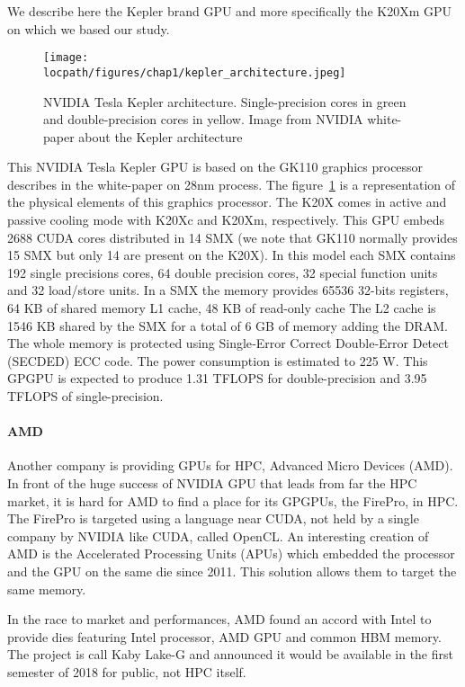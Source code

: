 We describe here the Kepler brand GPU and more specifically the K20Xm GPU on which we based our study. 
\begin{figure}
\centering
\texttt{[image: \\locpath/figures/chap1/kepler\_architecture.jpeg]}
\caption[NVIDIA Tesla Kepler architecture]{NVIDIA Tesla Kepler architecture. Single-precision cores in green and double-precision cores in yellow. Image from NVIDIA white-paper about the Kepler architecture\cite{nvidia2012nvidias}}
\label{fig:2_HARD:kepler_arch}
\end{figure}
This NVIDIA Tesla Kepler GPU is based on the GK110 graphics processor describes in the white-paper\cite{nvidia2012nvidias} on 28nm process.
The figure~\ref{fig:2_HARD:kepler_arch} is a representation of the physical elements of this graphics processor. 
The K20X comes in active and passive cooling mode with K20Xc and K20Xm, respectively.
This GPU embeds 2688 CUDA cores distributed in 14 SMX (we note that GK110 normally provides 15 SMX but only 14 are present on the K20X).
In this model each SMX contains 192 single precisions cores, 64 double precision cores, 32 special function units and 32 load/store units.
In a SMX the memory provides 65536 32-bits registers, 64 KB of shared memory L1 cache, 48 KB of read-only cache
The L2 cache is 1546 KB shared by the SMX for a total of 6 GB of memory adding the DRAM.
The whole memory is protected using Single‐Error Correct Double‐Error Detect (SECDED) ECC code.
The power consumption is estimated to 225 W.
This GPGPU is expected to produce 1.31 TFLOPS for double-precision and 3.95 TFLOPS of single-precision.

\paragraph{AMD}
Another company is providing GPUs for HPC, Advanced Micro Devices (AMD). 
In front of the huge success of NVIDIA GPU that leads from far the HPC market, it is hard for AMD to find a place for its GPGPUs, the FirePro, in HPC. 
The FirePro is targeted using a language near CUDA, not held by a single company by NVIDIA like CUDA, called OpenCL. 
An interesting creation of AMD is the Accelerated Processing Units (APUs) which embedded the processor and the GPU on the same die since 2011. 
This solution allows them to target the same memory. 

In the race to market and performances, AMD found an accord with Intel to provide dies featuring Intel processor, AMD GPU and common HBM memory. 
The project is call Kaby Lake-G and announced it would be available in the first semester of 2018 for public, not HPC itself. 

